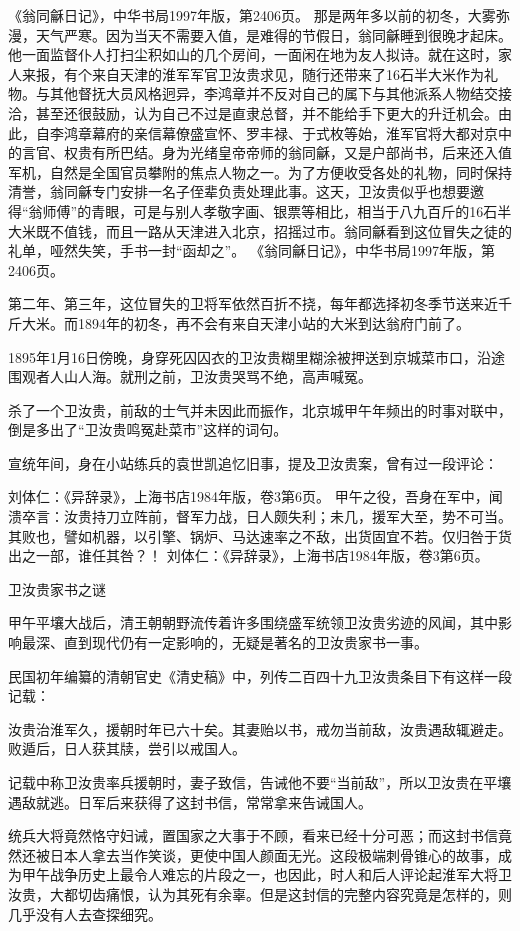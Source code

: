 \documentclass[12pt,UTF8]{ctexbook}
\begin{document}
《翁同龢日记》，中华书局1997年版，第2406页。
那是两年多以前的初冬，大雾弥漫，天气严寒。因为当天不需要入值，是难得的节假日，翁同龢睡到很晚才起床。他一面监督仆人打扫尘积如山的几个房间，一面闲在地为友人拟诗。就在这时，家人来报，有个来自天津的淮军军官卫汝贵求见，随行还带来了16石半大米作为礼物。与其他督抚大员风格迥异，李鸿章并不反对自己的属下与其他派系人物结交接洽，甚至还很鼓励，认为自己不过是直隶总督，并不能给手下更大的升迁机会。由此，自李鸿章幕府的亲信幕僚盛宣怀、罗丰禄、于式枚等始，淮军官将大都对京中的言官、权贵有所巴结。身为光绪皇帝帝师的翁同龢，又是户部尚书，后来还入值军机，自然是全国官员攀附的焦点人物之一。为了方便收受各处的礼物，同时保持清誉，翁同龢专门安排一名子侄辈负责处理此事。这天，卫汝贵似乎也想要邀得“翁师傅”的青眼，可是与别人孝敬字画、银票等相比，相当于八九百斤的16石半大米既不值钱，而且一路从天津进入北京，招摇过市。翁同龢看到这位冒失之徒的礼单，哑然失笑，手书一封“函却之”。 《翁同龢日记》，中华书局1997年版，第2406页。

第二年、第三年，这位冒失的卫将军依然百折不挠，每年都选择初冬季节送来近千斤大米。而1894年的初冬，再不会有来自天津小站的大米到达翁府门前了。

1895年1月16日傍晚，身穿死囚囚衣的卫汝贵糊里糊涂被押送到京城菜市口，沿途围观者人山人海。就刑之前，卫汝贵哭骂不绝，高声喊冤。

杀了一个卫汝贵，前敌的士气并未因此而振作，北京城甲午年频出的时事对联中，倒是多出了“卫汝贵鸣冤赴菜市”这样的词句。

宣统年间，身在小站练兵的袁世凯追忆旧事，提及卫汝贵案，曾有过一段评论：

刘体仁：《异辞录》，上海书店1984年版，卷3第6页。
甲午之役，吾身在军中，闻溃卒言：汝贵持刀立阵前，督军力战，日人颇失利；未几，援军大至，势不可当。其败也，譬如机器，以引擎、锅炉、马达速率之不敌，出货固宜不若。仅归咎于货出之一部，谁任其咎？！ 刘体仁：《异辞录》，上海书店1984年版，卷3第6页。

卫汝贵家书之谜

甲午平壤大战后，清王朝朝野流传着许多围绕盛军统领卫汝贵劣迹的风闻，其中影响最深、直到现代仍有一定影响的，无疑是著名的卫汝贵家书一事。

民国初年编纂的清朝官史《清史稿》中，列传二百四十九卫汝贵条目下有这样一段记载：

汝贵治淮军久，援朝时年已六十矣。其妻贻以书，戒勿当前敌，汝贵遇敌辄避走。败遁后，日人获其牍，尝引以戒国人。

记载中称卫汝贵率兵援朝时，妻子致信，告诫他不要“当前敌”，所以卫汝贵在平壤遇敌就逃。日军后来获得了这封书信，常常拿来告诫国人。

统兵大将竟然恪守妇诫，置国家之大事于不顾，看来已经十分可恶；而这封书信竟然还被日本人拿去当作笑谈，更使中国人颜面无光。这段极端刺骨锥心的故事，成为甲午战争历史上最令人难忘的片段之一，也因此，时人和后人评论起淮军大将卫汝贵，大都切齿痛恨，认为其死有余辜。但是这封信的完整内容究竟是怎样的，则几乎没有人去查探细究。
\end{document}
